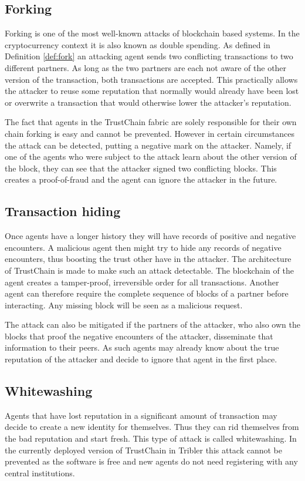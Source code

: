 \subsection{Forking}
Forking is one of the most well-known attacks of blockchain based systems. In the cryptocurrency 
context it is also known as double spending. As defined in Definition \ref{def:fork} an attacking agent 
sends two conflicting transactions to two different partners. As long as the two partners are each not 
aware of the other version of the transaction, both transactions are accepted. This practically 
allows the attacker to reuse some reputation that normally would already have been lost or overwrite
a transaction that would otherwise lower the attacker's reputation.

The fact that agents in the TrustChain fabric are solely responsible for their own chain forking is
easy and cannot be prevented. However in certain circumstances the attack can be detected, putting a
negative mark on the attacker. Namely, if one of the agents who were subject to the attack learn 
about the other version of the block, they can see that the attacker signed two conflicting blocks.
This creates a proof-of-fraud and the agent can ignore the attacker in the future. 

\subsection{Transaction hiding}
Once agents have a longer history they will have records of positive and negative encounters. A 
malicious agent then might try to hide any records of negative encounters, thus boosting the trust 
other have in the attacker. The architecture of TrustChain is made to make such an attack detectable.
The blockchain of the agent creates a tamper-proof, irreversible order for all transactions. Another
agent can therefore require the complete sequence of blocks of a partner before interacting. Any 
missing block will be seen as a malicious request. 

The attack can also be mitigated if the partners of the attacker, who also own the blocks that proof
the negative encounters of the attacker, disseminate that information to their peers. As such agents
may already know about the true reputation of the attacker and decide to ignore that agent in the 
first place.

\subsection{Whitewashing}
Agents that have lost reputation in a significant amount of transaction may decide to create a new 
identity for themselves. Thus they can rid themselves from the bad reputation and start fresh. This 
type of attack is called whitewashing. In the currently deployed version of TrustChain in Tribler 
this attack cannot be prevented as the software is free and new agents do not need registering with
any central institutions.

